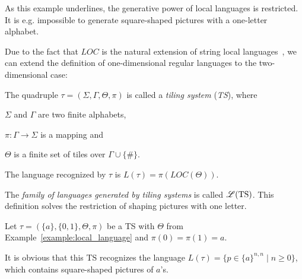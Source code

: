 As this example underlines, the generative power of local languages is restricted. It is e.g.
impossible to generate square-shaped pictures with a one-letter alphabet.

Due to the fact that $LOC$ is the natural extension of string local
languages~\cite{cherubini2009picture}, we can extend the definition of one-dimensional regular
languages to the two-dimensional case:
\begin{definition}
	The quadruple $\tau = (\Sigma, \Gamma, \Theta, \pi)$ is called a \emph{tiling system} (\emph{TS}),
	where
	\begin{compactitem}
		\item $\Sigma$ and $\Gamma$ are two finite alphabets, 
		\item $\pi: \Gamma \rightarrow \Sigma$ is a mapping and
		\item $\Theta$ is a finite set of tiles over $\Gamma \cup \{\#\}$.
	\end{compactitem}
	The language recognized by $\tau$ is $L(\tau) = \pi(LOC(\Theta))$.
\end{definition}
The \emph{family of languages generated by tiling systems} is called $\mathscr{L}(\text{TS})$. This
definition solves the restriction of shaping pictures with one letter.
\begin{example}
	Let $\tau = (\lbrace a \rbrace, \lbrace 0, 1 \rbrace, \Theta, \pi)$ be a TS with
	$\Theta$ from Example~\ref{example:local_language} and $\pi(0) = \pi(1) = a$.
\end{example}
It is obvious that this TS recognizes the language $L(\tau) = \{p \in \lbrace a
\rbrace^{n, n} \mid n \geq 0\}$, which contains square-shaped pictures of $a$'s.
\label{tiling_systems}